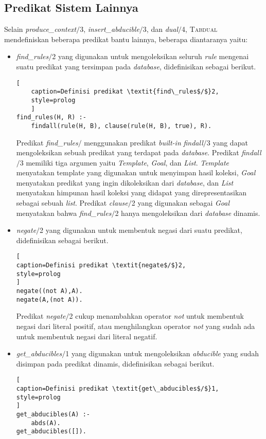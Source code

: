 \subsection{Predikat Sistem Lainnya}

Selain \textit{produce\_context$/$}3, \textit{insert\_abducible$/$}3, dan \textit{dual$/$}4, \textsc{Tabdual} mendefiniskan beberapa predikat bantu lainnya, beberapa diantaranya yaitu:

\begin{itemize}
	\item \textit{find\_rules$/$}2 yang digunakan untuk mengoleksikan seluruh \textit{rule} mengenai suatu predikat yang tersimpan pada \textit{database}, didefinisikan sebagai berikut.
	\\
	\begin{lstlisting}[
	caption=Definisi predikat \textit{find\_rules$/$}2,
	style=prolog
	]
find_rules(H, R) :-
	findall(rule(H, B), clause(rule(H, B), true), R).
	\end{lstlisting}
	
	Predikat \textit{find\_rules$/$} menggunakan predikat \textit{built-in} \textit{findall$/$}3 yang dapat mengoleksikan sebuah predikat yang terdapat pada \textit{database}. Predikat \textit{findall$/$}3 memiliki tiga argumen yaitu \textit{Template}, \textit{Goal}, dan \textit{List}. \textit{Template} menyatakan template yang digunakan untuk menyimpan hasil koleksi, \textit{Goal} menyatakan predikat yang ingin dikoleksikan dari \textit{database}, dan \textit{List} menyatakan himpunan hasil koleksi yang didapat yang direpresentasikan sebagai sebuah \textit{list}. Predikat \textit{clause$/$}2 yang digunakan sebagai \textit{Goal} menyatakan bahwa \textit{find\_rules$/$}2 hanya mengoleksikan dari \textit{database} dinamis.
	\item \textit{negate$/$}2 yang digunakan untuk membentuk negasi dari suatu predikat, didefinisikan sebagai berikut.
	\\
	
\begin{lstlisting}[
caption=Definisi predikat \textit{negate$/$}2,
style=prolog
]
negate((not A),A).
negate(A,(not A)).
\end{lstlisting}
	
	Predikat \textit{negate$/$}2 cukup menambahkan operator \textit{not} untuk membentuk negasi dari literal positif, atau menghilangkan operator \textit{not} yang sudah ada untuk membentuk negasi dari literal negatif.
	\item \textit{get\_abducibles$/$}1 yang digunakan untuk mengoleksikan \textit{abducible} yang sudah disimpan pada predikat dinamis, didefinisikan sebagai berikut.
	\\
\begin{lstlisting}[
caption=Definisi predikat \textit{get\_abducibles$/$}1,
style=prolog
]
get_abducibles(A) :-
	abds(A).
get_abducibles([]).
\end{lstlisting}	
	

\end{itemize}
